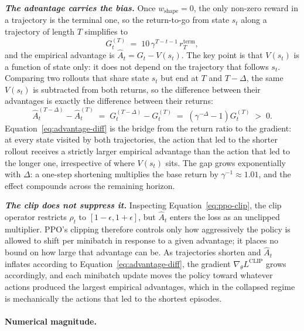\textit{\textbf{The advantage carries the bias.}} Once $w_{\text{shape}} = 0$, the only non-zero reward in a trajectory is the terminal one, so the return-to-go from state $s_t$ along a trajectory of length $T$ simplifies to
\begin{equation*}
G_t^{(T)} \;=\; 10\, \gamma^{T-t-1}\, r^{\text{term}}_{T},
\end{equation*}
and the empirical advantage is $\hat{A}_t = G_t - V(s_t)$. The key point is that $V(s_t)$ is a function of state only: it does not depend on the trajectory that follows $s_t$. Comparing two rollouts that share state $s_t$ but end at $T$ and $T - \Delta$, the same $V(s_t)$ is subtracted from both returns, so the difference between their advantages is exactly the difference between their returns:
\begin{equation}
\hat{A}_t^{(T-\Delta)} - \hat{A}_t^{(T)} \;=\; G_t^{(T-\Delta)} - G_t^{(T)} \;=\; \left(\gamma^{-\Delta} - 1\right) G_t^{(T)} \;>\; 0.
\label{eq:advantage-diff}
\end{equation}
Equation~\ref{eq:advantage-diff} is the bridge from the return ratio to the gradient: at every state visited by both trajectories, the action that led to the shorter rollout receives a strictly larger empirical advantage than the action that led to the longer one, irrespective of where $V(s_t)$ sits. The gap grows exponentially with $\Delta$: a one-step shortening multiplies the base return by $\gamma^{-1} \approx 1.01$, and the effect compounds across the remaining horizon.

\vspace*{0.1cm}

\textit{\textbf{The clip does not suppress it.}} Inspecting Equation~\ref{eq:ppo-clip}, the clip operator restricts $\rho_t$ to $[1-\epsilon, 1+\epsilon]$, but $\hat{A}_t$ enters the loss as an unclipped multiplier. PPO's clipping therefore controls only how aggressively the policy is allowed to shift per minibatch in response to a given advantage; it places no bound on how large that advantage can be. As trajectories shorten and $\hat{A}_t$ inflates according to Equation~\ref{eq:advantage-diff}, the gradient $\nabla_\theta L^{\text{CLIP}}$ grows accordingly, and each minibatch update moves the policy toward whatever actions produced the largest empirical advantages, which in the collapsed regime is mechanically the actions that led to the shortest episodes.

\paragraph*{Numerical magnitude.}

